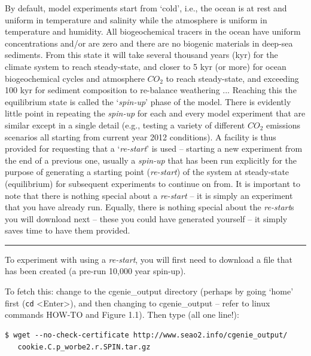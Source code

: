 By default, model experiments start from ‘cold’, i.e., the ocean is at rest and uniform in temperature and salinity while the atmosphere is uniform in temperature and humidity. All biogeochemical tracers in the ocean have uniform concentrations and/or are zero and there are no biogenic materials in deep-sea sediments. From this state it will take several thousand years (kyr) for the climate system to reach steady-state, and closer to 5 kyr (or more) for ocean biogeochemical cycles and atmosphere \(CO_{2}\) to reach steady-state, and exceeding 100 kyr for sediment composition to re-balance weathering ... Reaching this the equilibrium state is called the ‘\textit{spin-up}’ phase of the model.
There is evidently little point in repeating the \textit{spin-up} for each and every model experiment that are similar except in a single detail (e.g., testing a variety of different \(CO_{2}\) emissions scenarios all starting from current year 2012 conditions). A facility is thus provided for requesting that a ‘\textit{re-start}’ is used – starting a new experiment from the end of a previous one, usually a \textit{spin-up} that has been run explicitly for the purpose of generating a starting point (\textit{re-start}) of the system at steady-state (equilibrium) for subsequent experiments to continue on from.
It is important to note that there is nothing special about a \textit{re-start} – it is simply an experiment that you have already run. Equally, there is nothing special about the \textit{re-start}s you will download next – these you could have generated yourself – it simply saves time to have them provided.

\vspace{1mm}\noindent\rule{4cm}{0.1mm}\vspace{2mm}

\noindent To experiment with using a \textit{re-start}, you will first need to download a file that has been created (a pre-run 10,000 year spin-up).

\vspace{1mm}
To fetch this: change to the \textsf{\footnotesize cgenie\_output} directory (perhaps by going ‘home’ first (\texttt{cd} \textsf{\footnotesize <Enter>}), and then changing to \textsf{\footnotesize cgenie\_output} – refer to linux commands HOW-TO and Figure 1.1). Then type (all one line!):

\vspace{-2mm}\small
\begin{verbatim}
$ wget --no-check-certificate http://www.seao2.info/cgenie_output/
   cookie.C.p_worbe2.r.SPIN.tar.gz
\end{verbatim}\normalsize
\vspace{-2mm}

